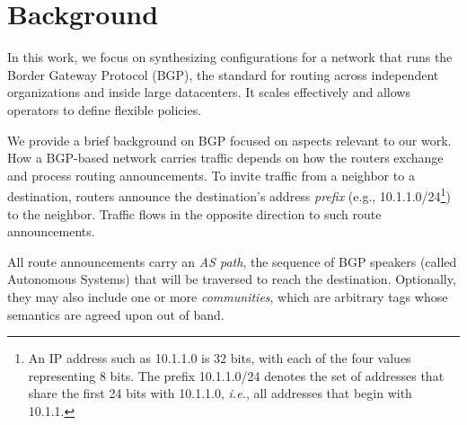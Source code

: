 \documentclass[numbers, 10pt, preprint]{sigplanconf}
\newcommand{\IE}{\emph{i.e.}}
\begin{document}


%
%
%
%

\section{Background}
\label{sec:background}

In this work, we focus on synthesizing configurations for a network that runs the Border Gateway Protocol (BGP), the standard for routing across independent organizations and inside large datacenters. It scales effectively and allows operators to define flexible policies.

We provide a brief background on BGP focused on aspects relevant to our work. How a BGP-based network carries traffic depends on how the routers exchange and process routing announcements. To invite traffic from a neighbor to a destination, routers announce the destination's address {\em prefix} (e.g., 10.1.1.0/24\footnote{An IP address
such as 10.1.1.0 is 32 bits, with each of the four values representing 8 bits. The prefix 10.1.1.0/24 denotes the set of addresses that share the first 24 bits with 10.1.1.0, \IE, all addresses that begin with 10.1.1.}) to the neighbor. Traffic flows in the opposite direction to such route announcements.

All route announcements carry an {\em AS path}, the sequence of BGP speakers (called Autonomous Systems) that will be traversed to reach the destination.
Optionally, they may also include one or more {\em communities}, which are arbitrary tags whose semantics are agreed upon out of band.
\end{document}
